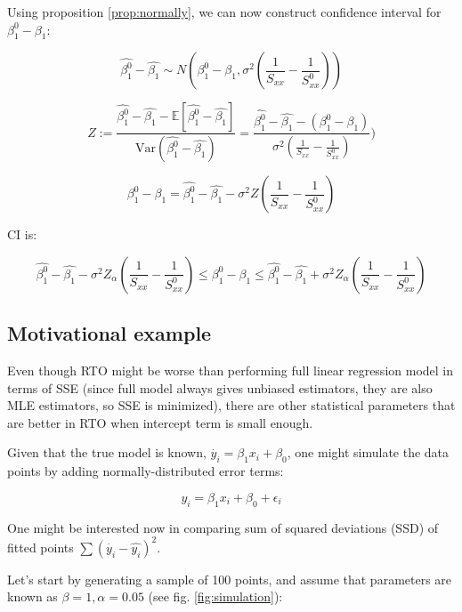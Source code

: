\documentclass[12pt,a4paper,oneside]{book} %
\newcommand{\E}{\mathbb{E}}
\newcommand{\Var}{\mathrm{Var}}
\begin{document}
Using proposition \ref{prop:normally}, we can now construct confidence interval for $\beta_1^0-\beta_1$:

\[
			\hat{\beta_1^0}-\hat{\beta_1} \sim N(\beta_1^0-\beta_1, \sigma^2(\frac{1}{S_{xx}}-\frac{1}{S_{xx}^0}))
\]

\[
	Z := \frac{\hat{\beta_1^0}-\hat{\beta_1}-\E [\hat{\beta_1^0}-\hat{\beta_1}]}{\Var (\hat{\beta_1^0}-\hat{\beta_1})}= \frac{\hat{\beta_1^0}-\hat{\beta_1}-(\beta_1^0-\beta_1)}{\sigma^2(\frac{1}{S_{xx}}-\frac{1}{S_{xx}^0})})
\]

\[
	\beta_1^0-\beta_1= \hat{\beta_1^0}-\hat{\beta_1} - \sigma^2 Z(\frac{1}{S_{xx}}-\frac{1}{S_{xx}^0})
\]

CI is:

\begin{equation}
\hat{\beta_1^0}-\hat{\beta_1} - \sigma^2 Z_{\alpha}(\frac{1}{S_{xx}}-\frac{1}{S_{xx}^0}) \leq \beta_1^0-\beta_1 \leq \hat{\beta_1^0}-\hat{\beta_1} + \sigma^2 Z_{\alpha}(\frac{1}{S_{xx}}-\frac{1}{S_{xx}^0})
\end{equation}




	\subsection{Motivational example}

Even though RTO might be worse than performing full linear regression model in terms of SSE (since full model always gives unbiased estimators, they are also MLE estimators, so SSE is minimized), there are other statistical parameters that are better in RTO when intercept term is small enough.

Given that the true model is known, $\dot{y_i} = \beta_1 x_i + \beta_0$, one might simulate the data points by adding normally-distributed error terms:

\[
	y_i =  \beta_1 x_i + \beta_0 + \epsilon_i
\]

One might be interested now in comparing sum of squared deviations (SSD) of fitted points $\sum (\dot{y_i}-\hat{y_i})^2 $.

Let's start by generating a sample of 100 points, and assume that parameters are known as $\beta = 1, \alpha = 0.05$ (see fig. \ref{fig:simulation}):
\end{document}
